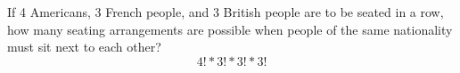 \item If 4 Americans, 3 French people, and 3 British people are to be seated in a row, how many seating arrangements are possible when people of the same nationality must sit next to each other?
\[ 4! * 3! * 3! * 3! \]